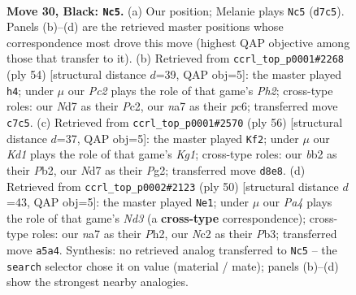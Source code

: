 \documentclass[11pt]{article}
\begin{document}
\clearpage

\begin{figure}[p]\centering
\begin{subfigure}{0.46\textwidth}\centering
\resizebox{\linewidth}{!}{%
\newchessgame
\chessboard[
  setfen={3k2r1/Nppnp2p/6p1/p7/5P1P/2P5/PBn2PK1/7R b - - 6 30},
  showmover=false,
  pgfstyle=straightmove, color=movearrow, markmove={d7-c5}
]}
\caption{}
\end{subfigure}\hfill
\begin{subfigure}{0.46\textwidth}\centering
\resizebox{\linewidth}{!}{%
\newchessgame
\chessboard[
  setfen={1r5k/2p4p/2p3p1/p7/2b5/P5N1/2P2PPP/3R2K1 w - - 0 28},
  showmover=false,
  pgfstyle=straightmove, color=movearrow, markmove={h2-h4}
]}
\caption{}
\end{subfigure}
\\[4pt]
\begin{subfigure}{0.46\textwidth}\centering
\resizebox{\linewidth}{!}{%
\newchessgame
\chessboard[
  setfen={5k2/p1Nb1pp1/3P4/1p2r3/2p3p1/8/PPP3PP/3R2K1 w - - 4 29},
  showmover=false,
  pgfstyle=straightmove, color=movearrow, markmove={g1-f2}
]}
\caption{}
\end{subfigure}\hfill
\begin{subfigure}{0.46\textwidth}\centering
\resizebox{\linewidth}{!}{%
\newchessgame
\chessboard[
  setfen={2r3k1/1b4pp/4pp2/pp6/4P3/1P1N1PP1/P6P/3R2K1 w - - 1 26},
  showmover=false,
  pgfstyle=straightmove, color=movearrow, markmove={d3-e1}
]}
\caption{}
\end{subfigure}
\caption{\textbf{Move 30, Black: \texttt{Nc5}.} (a) Our position; Melanie plays \texttt{Nc5} (\texttt{d7c5}). Panels (b)--(d) are the retrieved master positions whose correspondence most drove this move (highest QAP objective among those that transfer to it). (b) Retrieved from \texttt{ccrl\_top\_p0001\#2268} (ply 54) [structural distance $d$=39, QAP obj=5]: the master played \texttt{h4}; under $\mu$ our \emph{Pc2} plays the role of that game's \emph{Ph2}; cross-type roles: our \emph{N}d7 as their \emph{P}c2, our \emph{n}a7 as their \emph{p}c6; transferred move \texttt{c7c5}. (c) Retrieved from \texttt{ccrl\_top\_p0001\#2570} (ply 56) [structural distance $d$=37, QAP obj=5]: the master played \texttt{Kf2}; under $\mu$ our \emph{Kd1} plays the role of that game's \emph{Kg1}; cross-type roles: our \emph{b}b2 as their \emph{P}b2, our \emph{N}d7 as their \emph{P}g2; transferred move \texttt{d8e8}. (d) Retrieved from \texttt{ccrl\_top\_p0002\#2123} (ply 50) [structural distance $d$=43, QAP obj=5]: the master played \texttt{Ne1}; under $\mu$ our \emph{Pa4} plays the role of that game's \emph{Nd3} (a \textbf{cross-type} correspondence); cross-type roles: our \emph{n}a7 as their \emph{P}h2, our \emph{N}c2 as their \emph{P}b3; transferred move \texttt{a5a4}. Synthesis: no retrieved analog transferred to \texttt{Nc5} -- the \texttt{search} selector chose it on value (material / mate); panels (b)--(d) show the strongest nearby analogies.}
\label{fig:thought-m59}
\end{figure}
\end{document}
